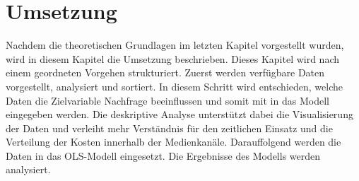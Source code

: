 \newpage
\section{Umsetzung}
\label{Umsetzung}
Nachdem die theoretischen Grundlagen im letzten Kapitel vorgestellt wurden, wird in diesem Kapitel die Umsetzung beschrieben. Dieses Kapitel wird nach einem geordneten Vorgehen strukturiert. Zuerst werden verfügbare Daten vorgestellt, analysiert und sortiert. In diesem Schritt wird entschieden, welche Daten die Zielvariable Nachfrage beeinflussen und somit mit in das Modell eingegeben werden. Die deskriptive Analyse unterstützt dabei die Visualisierung der Daten und verleiht mehr Verständnis für den zeitlichen Einsatz und die Verteilung der Kosten innerhalb der Medienkanäle. Darauffolgend werden die Daten in das \ac{OLS}-Modell eingesetzt. Die Ergebnisse des Modells werden analysiert.

